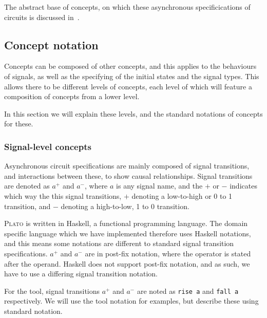 \documentclass[british,conference,compsoc]{IEEEtran}
\newcommand{\noun}[1]{\textsc{#1}}
\begin{document}
\vspace{-3mm}

The abstract base of concepts, on which these asynchronous specificications of 
circuits is discussed in~\cite{2015_Beaumont_MEMOCODE}.

\vspace{-3mm}

\subsection{Concept notation \label{sub:concept-notation}}

\vspace{-3mm}

Concepts can be composed of other concepts, and this applies to the behaviours 
of signals, as well as the specifying of the initial states and the signal 
types. This allows there to be different levels of concepts, each level of 
which will feature a composition of concepts from a lower level. 

In this section we will explain these levels, and the standard notations of 
concepts for these. 

\vspace{-2mm}

\subsubsection{\label{signal-level}Signal-level concepts}Asynchronous circuit 
specifications are mainly composed of signal transitions, and interactions 
between these, to show causal relationships. Signal transitions are denoted as 
$a^{+}$ and $a^{-}$, where $a$ is any signal name, and 
the $+$ or $-$ indicates which way the this signal transitions, $+$ denoting a 
low-to-high or 0 to 1 transition, and $-$ denoting a high-to-low, 1 to 0 
transition. 

\noun{Plato} is written in Haskell, a functional programming language. The 
domain specific language which we have implemented therefore uses Haskell 
notations, and this means some notations are different to standard signal 
transition specifications. $a^{+}$ and $a^{-}$ are in post-fix notation, where 
the operator is stated after the operand. Haskell does not support post-fix 
notation, and as such, we have to use a differing signal transition notation. 

For the tool, signal transitions $a^{+}$ and $a^{-}$ are noted as \texttt{rise a} and 
\texttt{fall a} respectively. We will use the tool notation for examples, but 
describe these using standard notation.
\end{document}
